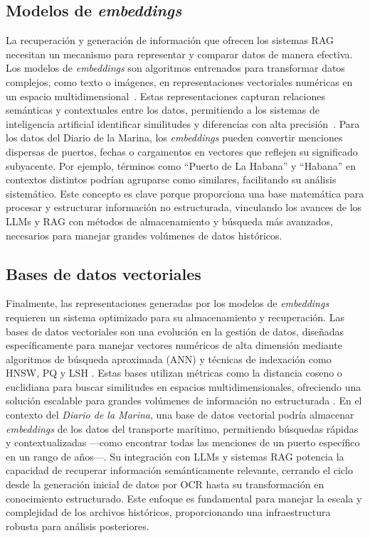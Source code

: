 \subsection{Modelos de \textit{embeddings}}\label{seq_5}

La recuperación y generación de información que ofrecen los sistemas RAG necesitan un mecanismo para representar y comparar datos de manera efectiva. Los modelos de \textit{embeddings} son algoritmos entrenados para transformar datos complejos, como texto o imágenes, en representaciones vectoriales numéricas en un espacio multidimensional~\cite{mikolov2013efficient}. Estas representaciones capturan relaciones semánticas y contextuales entre los datos, permitiendo a los sistemas de inteligencia artificial identificar similitudes y diferencias con alta precisión~\cite{mikolov2013efficient}.
Para los datos del Diario de la Marina, los \textit{embeddings} pueden convertir menciones dispersas de puertos, fechas o cargamentos en vectores que reflejen su significado subyacente. Por ejemplo, términos como ``Puerto de La Habana'' y ``Habana'' en contextos distintos podrían agruparse como similares, facilitando su análisis sistemático. Este concepto es clave porque proporciona una base matemática para procesar y estructurar información no estructurada, vinculando los avances de los LLMs y RAG con métodos de almacenamiento y búsqueda más avanzados, necesarios para manejar grandes volúmenes de datos históricos.


\subsection{Bases de datos vectoriales}\label{seq_6}

Finalmente, las representaciones generadas por los modelos de \textit{embeddings} requieren un sistema optimizado para su almacenamiento y recuperación. Las bases de datos vectoriales son una evolución en la gestión de datos, diseñadas específicamente para manejar vectores numéricos de alta dimensión mediante algoritmos de búsqueda aproximada (ANN) y técnicas de indexación como HNSW, PQ y LSH \cite{xie2023brief, han2023comprehensive}. Estas bases utilizan métricas como la distancia coseno o euclidiana para buscar similitudes en espacios multidimensionales, ofreciendo una solución escalable para grandes volúmenes de información no estructurada \cite{azizi2024vector, sun2024soar}.
En el contexto del \textit{Diario de la Marina}, una base de datos vectorial podría almacenar \textit{embeddings} de los datos del transporte marítimo, permitiendo búsquedas rápidas y contextualizadas —como encontrar todas las menciones de un puerto específico en un rango de años—. Su integración con LLMs y sistemas RAG potencia la capacidad de recuperar información semánticamente relevante, cerrando el ciclo desde la generación inicial de datos por OCR hasta su transformación en conocimiento estructurado. Este enfoque es fundamental para manejar la escala y complejidad de los archivos históricos, proporcionando una infraestructura robusta para análisis posteriores.


